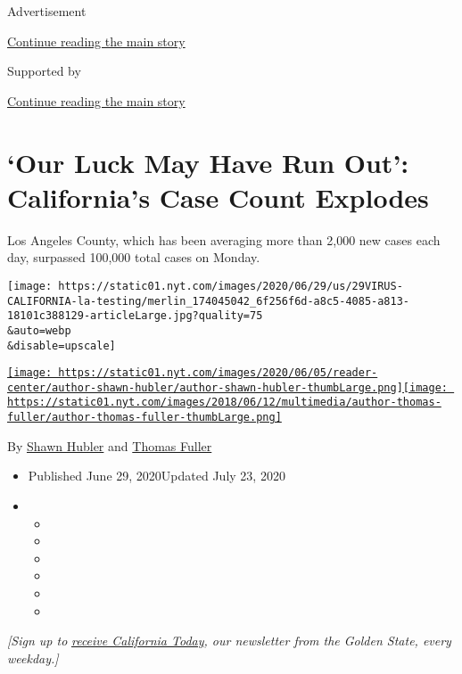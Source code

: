 Advertisement

\protect\hyperlink{after-top}{Continue reading the main story}

Supported by

\protect\hyperlink{after-sponsor}{Continue reading the main story}

\hypertarget{our-luck-may-have-run-out-californias-case-count-explodes}{%
\section{`Our Luck May Have Run Out': California's Case Count
Explodes}\label{our-luck-may-have-run-out-californias-case-count-explodes}}

Los Angeles County, which has been averaging more than 2,000 new cases
each day, surpassed 100,000 total cases on Monday.

\texttt{[image: https://static01.nyt.com/images/2020/06/29/us/29VIRUS-CALIFORNIA-la-testing/merlin\_174045042\_6f256f6d-a8c5-4085-a813-18101c388129-articleLarge.jpg?quality=75\\\&auto=webp\\\&disable=upscale]}

\href{https://www.nytimes.com/by/shawn-hubler}{\texttt{[image: https://static01.nyt.com/images/2020/06/05/reader-center/author-shawn-hubler/author-shawn-hubler-thumbLarge.png]}}\href{https://www.nytimes.com/by/thomas-fuller}{\texttt{[image: https://static01.nyt.com/images/2018/06/12/multimedia/author-thomas-fuller/author-thomas-fuller-thumbLarge.png]}}

By \href{https://www.nytimes.com/by/shawn-hubler}{Shawn Hubler} and
\href{https://www.nytimes.com/by/thomas-fuller}{Thomas Fuller}

\begin{itemize}
\item
  Published June 29, 2020Updated July 23, 2020
\item
  \begin{itemize}
  \item
  \item
  \item
  \item
  \item
  \item
  \end{itemize}
\end{itemize}

\emph{{[}Sign up to}
\href{https://www.nytimes.com/newsletters/california-today}{\emph{receive
California Today}}\emph{, our newsletter from the Golden State, every
weekday.{]}}

